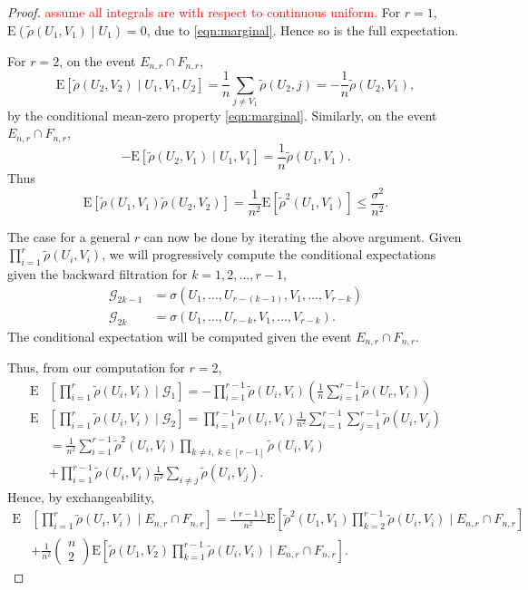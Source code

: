 \documentclass[10pt,a4paper]{amsart}
\newcommand{\E}{\mathrm{E}}
\newcommand{\combi}[2]{\begin{pmatrix}#1 \\ #2 \end{pmatrix}}
\begin{document}
\begin{proof}
  \textcolor{red}{assume all integrals are with respect to continuous uniform.}  For $r=1$, $\E(\tilde{\rho}(U_1, V_1) \mid U_1)=0$, due to \eqref{eqn:marginal}. Hence so is the full expectation. 

  For $r=2$, on the event $E_{n,r} \cap F_{n,r}$,
  \[
  \E\left[ \tilde{\rho}(U_2, V_2) \mid U_1, V_1, U_2 \right]= \frac{1}{n} \sum_{j\neq V_1} \tilde{\rho}(U_2, j)= - \frac{1}{n}\tilde{\rho}(U_2, V_1),
  \]
  by the conditional mean-zero property \eqref{eqn:marginal}. Similarly, on the event $E_{n,r} \cap F_{n,r}$,
  \[
  -\E\left[ \tilde{\rho}(U_2, V_1) \mid U_1, V_1 \right]=  \frac{1}{n}\tilde{\rho}(U_1, V_1).
  \]
  Thus
  \[
  \E\left[ \tilde{\rho}(U_1, V_1)\tilde{\rho}(U_2, V_2)
  \right]= \frac{1}{n^2} \E\left[ \tilde{\rho}^2(U_1, V_1)\right]\le \frac{\sigma^2}{n^2}.
  \]

The case for a general $r$ can now be done by iterating the above argument. Given $\prod_{i=1}^r \tilde{\rho}(U_i, V_i)$, we will progressively compute the conditional expectations given the backward filtration for $k=1,2,\ldots, r-1$, 
\[
\begin{split}
\mathcal{G}_{2k-1}&=\sigma\left( U_1, \ldots, U_{r-(k-1)}, V_1, \ldots, V_{r-k}\right)\\
\mathcal{G}_{2k}&=\sigma\left( U_1, \ldots, U_{r-k}, V_1, \ldots, V_{r-k}\right).
\end{split}
\]
The conditional expectation will be computed given the event $E_{n,r} \cap F_{n,r}$.  

Thus, from our computation for $r=2$,  
\[
\begin{split}
\E&\left[ \prod_{i=1}^r \tilde{\rho}(U_i, V_i) \mid \mathcal{G}_1 \right]=-\prod_{i=1}^{r-1} \tilde{\rho}(U_i, V_i) \left( \frac{1}{n} \sum_{i=1}^{r-1} \tilde{\rho}(U_r, V_i) \right)\\
\E&\left[ \prod_{i=1}^r \tilde{\rho}(U_i, V_i) \mid \mathcal{G}_2 \right]=\prod_{i=1}^{r-1} \tilde{\rho}(U_i, V_i) \frac{1}{n^2} \sum_{i=1}^{r-1} \sum_{j=1}^{r-1} \tilde{\rho}(U_i, V_j)\\
&= \frac{1}{n^2} \sum_{i=1}^{r-1} \tilde{\rho}^2(U_i, V_i) \prod_{k\neq i,\; k\in [r-1]} \tilde{\rho}(U_i, V_i)  \\
&+ \prod_{i=1}^{r-1} \tilde{\rho}(U_i, V_i) \frac{1}{n^2} \sum_{i\neq j} \tilde{\rho}(U_i, V_j).
\end{split}
\]
Hence, by exchangeability, 
\[
\begin{split}
\E&\left[ \prod_{i=1}^r \tilde{\rho}(U_i, V_i) \mid E_{n,r} \cap F_{n,r} \right]= \frac{(r-1)}{n^2} \E\left[ \tilde{\rho}^2(U_1, V_1) \prod_{k=2}^{r-1} \tilde{\rho}(U_i, V_i) \mid E_{n,r} \cap F_{n,r} \right]\\
&+ \frac{1}{n^2} \combi{n}{2} \E\left[ \tilde{\rho}(U_1, V_2)\prod_{k=1}^{r-1} \tilde{\rho}(U_i, V_i) \mid E_{n,r} \cap F_{n,r} \right].
\end{split}
\]


\end{proof}
\end{document}
